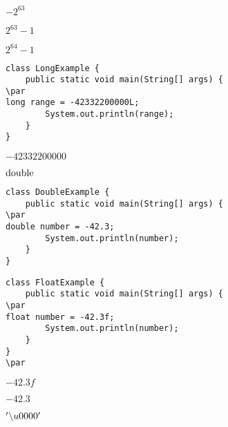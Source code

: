 \documentclass{book}
\def\lthtmlcheckvsize{\ifdim\ht\sizebox<\vsize 
  \ifdim\wd\sizebox<\hsize\expandafter\hfill\fi \expandafter\vfill
  \else\expandafter\vss\fi}%
\begin{document}
{\newpage\clearpage
{}%
$-2^63$%
\lthtmlindisplaymathZ
\lthtmlcheckvsize\clearpage}

{\newpage\clearpage
{}%
$2^{63}-1$%
\lthtmlindisplaymathZ
\lthtmlcheckvsize\clearpage}

{\newpage\clearpage
{}%
$2^{64}-1$%
\lthtmlindisplaymathZ
\lthtmlcheckvsize\clearpage}

{\newpage\clearpage
{}%
\begin{lstlisting}
class LongExample {
    public static void main(String[] args) {
\par
long range = -42332200000L;
        System.out.println(range);
    }
}
\end{lstlisting}%
\lthtmlfigureZ
\lthtmlcheckvsize\clearpage}

{\newpage\clearpage
{}%
$-42332200000$%
\lthtmlindisplaymathZ
\lthtmlcheckvsize\clearpage}

{\newpage\clearpage
{}%
$\lstinline{double}$%
\lthtmlindisplaymathZ
\lthtmlcheckvsize\clearpage}

{\newpage\clearpage
{}%
\begin{lstlisting}
class DoubleExample {
    public static void main(String[] args) {
\par
double number = -42.3;
        System.out.println(number);
    }
}
\end{lstlisting}%
\lthtmlfigureZ
\lthtmlcheckvsize\clearpage}

{\newpage\clearpage
{}%
\begin{lstlisting}
class FloatExample {
    public static void main(String[] args) {
\par
float number = -42.3f;
        System.out.println(number);
    }
}
\par
\end{lstlisting}%
\lthtmlfigureZ
\lthtmlcheckvsize\clearpage}

{\newpage\clearpage
{}%
$-42.3f$%
\lthtmlindisplaymathZ
\lthtmlcheckvsize\clearpage}

{\newpage\clearpage
{}%
$-42.3$%
\lthtmlindisplaymathZ
\lthtmlcheckvsize\clearpage}

{\newpage\clearpage
{}%
$'\symbol{92}u0000'$%
\lthtmlindisplaymathZ
\lthtmlcheckvsize\clearpage}
\end{document}
